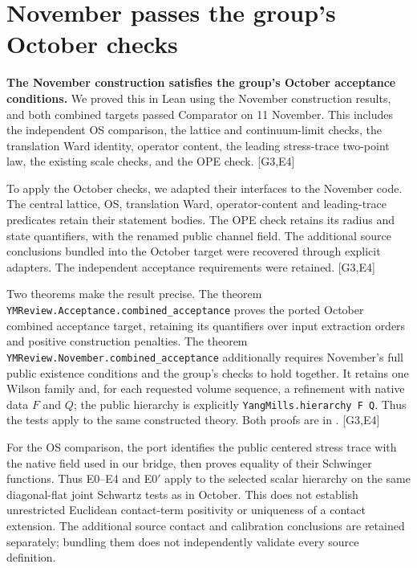 \documentclass[11pt]{article}
\newcommand{\code}[1]{{\small\nolinkurl{#1}}}
\newcommand{\src}[1]{\textsf{[#1]}}
\begin{document}
\section{November passes the group's October checks}
\label{sec:remaining}

\textbf{The November construction satisfies the group's October acceptance
conditions.} We proved this in Lean using the November construction results,
and both combined targets passed Comparator on 11 November. This includes
the independent OS comparison, the lattice and continuum-limit checks,
the translation Ward identity, operator content, the leading stress-trace
two-point law, the existing scale checks, and the OPE check. \src{G3,E4}

To apply the October checks, we adapted their interfaces to the November code.
The central lattice, OS, translation Ward, operator-content and leading-trace
predicates retain their statement bodies. The OPE check retains its radius
and state quantifiers, with the renamed public channel field. The additional
source conclusions bundled into the October target were recovered through
explicit adapters. The independent acceptance requirements were retained.
\src{G3,E4}

Two theorems make the result precise. The theorem
\code{YMReview.Acceptance.combined_acceptance} proves the ported October
combined acceptance target, retaining its quantifiers over input extraction
orders and positive construction penalties. The theorem
\code{YMReview.November.combined_acceptance} additionally requires November's
full public existence conditions and the group's checks to hold together.
It retains one Wilson family and, for each requested volume sequence, a
refinement with native data $F$ and $Q$; the public hierarchy is explicitly
\code{YangMills.hierarchy F Q}. Thus the tests apply to the same constructed
theory. Both proofs are in . \src{G3,E4}

For the OS comparison, the port identifies the public centered stress trace
with the native field used in our bridge, then proves equality of their
Schwinger functions. Thus E0--E4 and E0$'$ apply to the selected scalar
hierarchy on the same diagonal-flat joint Schwartz tests as in October.
This does not establish unrestricted Euclidean contact-term positivity or
uniqueness of a contact extension. The additional source contact and
calibration conclusions are retained separately; bundling them does not
independently validate every source definition.
\end{document}
